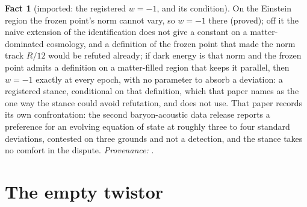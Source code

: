 \documentclass[11pt]{article}
\theoremstyle{definition}
\newtheorem{fact}[theorem]{Fact}
\begin{document}
\begin{fact}[imported: the registered $w = -1$, and its condition]\label{fact:wminusone}
On the Einstein region the frozen point's norm cannot vary, so $w = -1$ there (proved); off it the naive extension of the identification does not give a constant on a matter-dominated cosmology, and a definition of the frozen point that made the norm track $R/12$ would be refuted already; if dark energy is that norm and the frozen point admits a definition on a matter-filled region that keeps it parallel, then $w = -1$ exactly at every epoch, with no parameter to absorb a deviation: a registered stance, conditional on that definition, which that paper names as the one way the stance could avoid refutation, and does not use. That paper records its own confrontation: the second baryon-acoustic data release reports a preference for an evolving equation of state at roughly three to four standard deviations, contested on three grounds and not a detection, and the stance takes no comfort in the dispute. \emph{Provenance:} \cite[Prop.~4.2(i)-(iii) and the confrontation recorded there]{ButlerT10}.
\end{fact}

\section{The empty twistor}\label{sec:empty}
\end{document}
